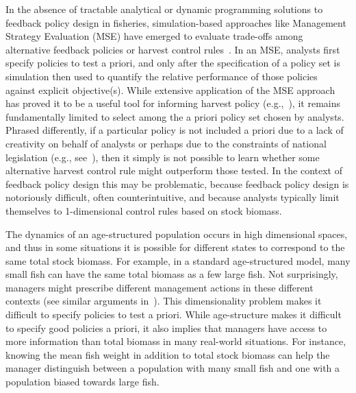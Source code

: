 \documentclass[floatfix,nofootinbib,longbibliography,notitlepage]{revtex4-2}
\def\eg{e.g.}
\begin{document}
In the absence of tractable analytical or dynamic programming solutions to feedback policy design in fisheries, simulation-based approaches like Management Strategy Evaluation (MSE) have emerged to evaluate trade-offs among alternative feedback policies or harvest control rules~\cite{punt-mse}.
In an MSE, analysts first specify policies to test a priori, and only after the specification of a policy set is simulation then used to quantify the relative performance of those policies against explicit objective(s).
While extensive application of the MSE approach has proved it to be a useful tool for informing harvest policy (\eg,~\cite{edwards2016-mse}), it remains fundamentally limited to select among the a priori policy set chosen by analysts.  
Phrased differently, if a particular policy is not included a priori due to a lack of creativity on behalf of analysts or perhaps due to the constraints of national legislation (\eg, see~\cite{dfo2006}), then it simply is not possible to learn whether some alternative harvest control rule might outperform those tested.  
In the context of feedback policy design this may be problematic, because feedback policy design is notoriously difficult, often counterintuitive, and because analysts typically limit themselves to 1-dimensional control rules based on stock biomass. 
	
The dynamics  of an age-structured population occurs in  high dimensional spaces, and thus in some situations it is possible for different states to correspond to the same total stock biomass.  
For example, in a standard  age-structured model, many small fish can have the same total biomass as a few large fish. Not surprisingly, managers might prescribe different management actions  in  these different contexts (see similar arguments in~\cite{hilborn2002}). 
This dimensionality problem makes it difficult  to specify policies to test a priori. 
While age-structure makes it difficult to specify good policies a priori, it also implies that  managers have access to more information than total biomass in many real-world situations. 
For instance, knowing the mean fish weight in addition to total stock biomass can help the manager distinguish between a population with many small fish and one with a population biased towards large fish. 
	
\end{document}
